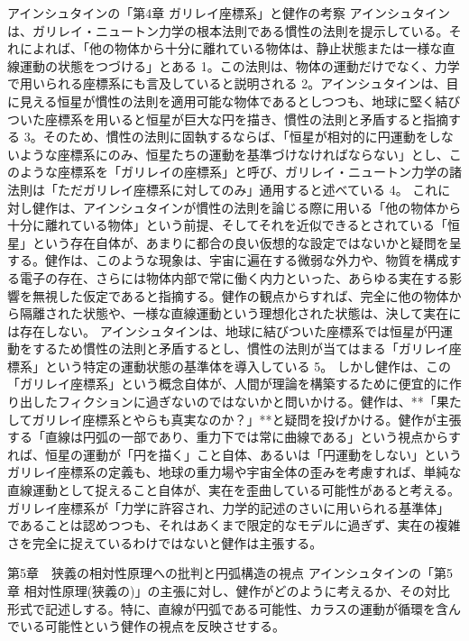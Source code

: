 \documentclass{article}
\begin{document}
アインシュタインの「第4章 ガリレイ座標系」と健作の考察
アインシュタインは、ガリレイ・ニュートン力学の根本法則である慣性の法則を提示している。それによれば、「他の物体から十分に離れている物体は、静止状態または一様な直線運動の状態をつづける」とある 1。この法則は、物体の運動だけでなく、力学で用いられる座標系にも言及していると説明される 2。アインシュタインは、目に見える恒星が慣性の法則を適用可能な物体であるとしつつも、地球に堅く結びついた座標系を用いると恒星が巨大な円を描き、慣性の法則と矛盾すると指摘する 3。そのため、慣性の法則に固執するならば、「恒星が相対的に円運動をしないような座標系にのみ、恒星たちの運動を基準づけなければならない」とし、このような座標系を「ガリレイの座標系」と呼び、ガリレイ・ニュートン力学の諸法則は「ただガリレイ座標系に対してのみ」通用すると述べている 4。
これに対し健作は、アインシュタインが慣性の法則を論じる際に用いる「他の物体から十分に離れている物体」という前提、そしてそれを近似できるとされている「恒星」という存在自体が、あまりに都合の良い仮想的な設定ではないかと疑問を呈する。健作は、このような現象は、宇宙に遍在する微弱な外力や、物質を構成する電子の存在、さらには物体内部で常に働く内力といった、あらゆる実在する影響を無視した仮定であると指摘する。健作の観点からすれば、完全に他の物体から隔離された状態や、一様な直線運動という理想化された状態は、決して実在には存在しない。
アインシュタインは、地球に結びついた座標系では恒星が円運動をするため慣性の法則と矛盾するとし、慣性の法則が当てはまる「ガリレイ座標系」という特定の運動状態の基準体を導入している 5。
しかし健作は、この「ガリレイ座標系」という概念自体が、人間が理論を構築するために便宜的に作り出したフィクションに過ぎないのではないかと問いかける。健作は、**「果たしてガリレイ座標系とやらも真実なのか？」**と疑問を投げかける。健作が主張する「直線は円弧の一部であり、重力下では常に曲線である」という視点からすれば、恒星の運動が「円を描く」こと自体、あるいは「円運動をしない」というガリレイ座標系の定義も、地球の重力場や宇宙全体の歪みを考慮すれば、単純な直線運動として捉えること自体が、実在を歪曲している可能性があると考える。ガリレイ座標系が「力学に許容され、力学的記述のさいに用いられる基準体」であることは認めつつも、それはあくまで限定的なモデルに過ぎず、実在の複雑さを完全に捉えているわけではないと健作は主張する。



第5章　狭義の相対性原理への批判と円弧構造の視点
アインシュタインの「第5章 相対性原理(狭義の)」の主張に対し、健作がどのように考えるか、その対比形式で記述しする。特に、直線が円弧である可能性、カラスの運動が循環を含んでいる可能性という健作の視点を反映させする。
\end{document}
